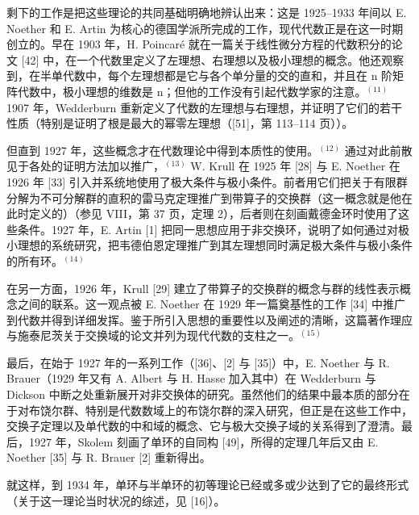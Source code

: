 剩下的工作是把这些理论的共同基础明确地辨认出来：这是 1925--1933 年间以 E. Noether 和 E. Artin 为核心的德国学派所完成的工作，现代代数正是在这一时期创立的。早在 1903 年，H. Poincaré 就在一篇关于线性微分方程的代数积分的论文 {[}42{]} 中，在一个代数里定义了左理想、右理想以及极小理想的概念。他还观察到，在半单代数中，每个左理想都是它与各个单分量的交的直和，并且在 n 阶矩阵代数中，极小理想的维数是 n；但他的工作没有引起代数学家的注意。\(^{(11)}\) 1907 年，Wedderburn 重新定义了代数的左理想与右理想，并证明了它们的若干性质（特别是证明了根是最大的幂零左理想（{[}51{]}，第 113--114 页））。

但直到 1927 年，这些概念才在代数理论中得到本质性的使用。\(^{(12)}\) 通过对此前散见于各处的证明方法加以推广，\(^{(13)}\) W. Krull 在 1925 年 {[}28{]} 与 E. Noether 在 1926 年 {[}33{]} 引入并系统地使用了极大条件与极小条件。前者用它们把关于有限群分解为不可分解群的直积的雷马克定理推广到带算子的交换群（这一概念就是他在此时定义的）（参见 VIII，第 37 页，定理 2），后者则在刻画戴德金环时使用了这些条件。1927 年，E. Artin {[}1{]} 把同一思想应用于非交换环，说明了如何通过对极小理想的系统研究，把韦德伯恩定理推广到其左理想同时满足极大条件与极小条件的所有环。\(^{(14)}\)

在另一方面，1926 年，Krull {[}29{]} 建立了带算子的交换群的概念与群的线性表示概念之间的联系。这一观点被 E. Noether 在 1929 年一篇奠基性的工作 {[}34{]} 中推广到代数并得到详细发挥。鉴于所引入思想的重要性以及阐述的清晰，这篇著作理应与施泰尼茨关于交换域的论文并列为现代代数的支柱之一。\(^{(15)}\)

最后，在始于 1927 年的一系列工作（{[}36{]}、{[}2{]} 与 {[}35{]}）中，E. Noether 与 R. Brauer（1929 年又有 A. Albert 与 H. Hasse 加入其中）在 Wedderburn 与 Dickson 中断之处重新展开对非交换体的研究。虽然他们的结果中最本质的部分在于对布饶尔群、特别是代数数域上的布饶尔群的深入研究，但正是在这些工作中，交换子定理以及单代数的中和域的概念、它与极大交换子域的关系得到了澄清。最后，1927 年，Skolem 刻画了单环的自同构 {[}49{]}，所得的定理几年后又由 E. Noether {[}35{]} 与 R. Brauer {[}2{]} 重新得出。

就这样，到 1934 年，单环与半单环的初等理论已经或多或少达到了它的最终形式（关于这一理论当时状况的综述，见 {[}16{]}）。
